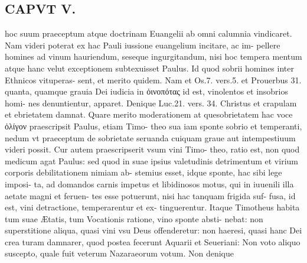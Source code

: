 \documentclass{article}
\begin{document}
\begin{pages}
\section*{CAPVT  V. }
\marginpar{[ p.369 ]}\pstart hoc suum praeceptum atque doctrinam Euangelii ab omni calumnia vindicaret. Nam videri poterat ex hac Pauli iussione euangelium incitare, ac im- pellere homines ad vinum hauriendum, seseque ingurgitandum, nisi hoc tempera mentum atque hanc velut exceptionem subtexuisset Paulus. Id quod sobrii homines inter Ethnicos vituperas- sent, et merito quidem. Nam et Os.7. vers.5. et Prouerbus 31. quanta, quamque grauia Dei iudicia in ὀινοπότας id est, vinolentos et insobrios homi- nes denuntientur, apparet. Denique Luc.21. vers. 34. Christus et crapulam et ebrietatem damnat. Quare merito moderationem at quesobrietatem hac voce ὀλίγον praescripsit Paulus, etiam Timo- theo sua iam sponte sobrio et temperanti, nedum vt praeceptum de sobrietate seruanda cuiquam graue aut intempestiuum videri possit.  \pend\pstart Cur autem praescripserit vsum vini Timo- theo, ratio est, non quod medicum agat Paulus: sed quod in suae ipsius valetudinis detrimentum et virium corporis debilitationem nimiam ab- stemius esset, idque sponte, hac sibi lege imposi- ta, ad domandos carnis impetus et libidinosos motus, qui in iuuenili illa aetate magni et feruen- tes esse potuerunt, nisi hac tanquam frigida suf- fusa, id est, vini detractione, temperarentur et ex- tinguerentur. Itaque Timotheus habita tum suae Ætatis, tum Vocationis ratione, vino sponte absti- nebat: non superstitione aliqua, quasi vini vsu Deus offenderetur: non haeresi, quasi hanc Dei crea turam damnarer, quod postea fecerunt Aquarii et Seueriani: Non voto aliquo suscepto, quale fuit veterum Nazaraeorum votum. Non denique  \pend

\end{pages}
\end{document}
